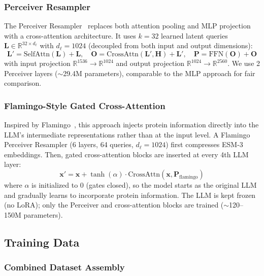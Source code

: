 \documentclass[11pt]{article}
\begin{document}
\subsubsection{Perceiver Resampler}

The Perceiver Resampler~\cite{alayrac2022flamingo} replaces both attention pooling and MLP projection with a cross-attention architecture. It uses $k = 32$ learned latent queries $\mathbf{L} \in \mathbb{R}^{32 \times d_\ell}$ with $d_\ell = 1024$ (decoupled from both input and output dimensions):
\begin{equation}
    \mathbf{L}' = \text{SelfAttn}(\mathbf{L}) + \mathbf{L}, \quad
    \mathbf{O} = \text{CrossAttn}(\mathbf{L}', \mathbf{H}) + \mathbf{L}', \quad
    \mathbf{P} = \text{FFN}(\mathbf{O}) + \mathbf{O}
\end{equation}
with input projection $\mathbb{R}^{1536} \to \mathbb{R}^{1024}$ and output projection $\mathbb{R}^{1024} \to \mathbb{R}^{2560}$. We use 2 Perceiver layers ($\sim$29.4M parameters), comparable to the MLP approach for fair comparison.

\subsubsection{Flamingo-Style Gated Cross-Attention}

Inspired by Flamingo~\cite{alayrac2022flamingo}, this approach injects protein information directly into the LLM's intermediate representations rather than at the input level. A Flamingo Perceiver Resampler (6 layers, 64 queries, $d_\ell = 1024$) first compresses ESM-3 embeddings. Then, gated cross-attention blocks are inserted at every 4th LLM layer:
\begin{equation}
    \mathbf{x}' = \mathbf{x} + \tanh(\alpha) \cdot \text{CrossAttn}(\mathbf{x}, \mathbf{P}_\text{flamingo})
\end{equation}
where $\alpha$ is initialized to 0 (gates closed), so the model starts as the original LLM and gradually learns to incorporate protein information. The LLM is kept frozen (no LoRA); only the Perceiver and cross-attention blocks are trained ($\sim$120--150M parameters).

\subsection{Training Data}

\subsubsection{Combined Dataset Assembly}
\end{document}
